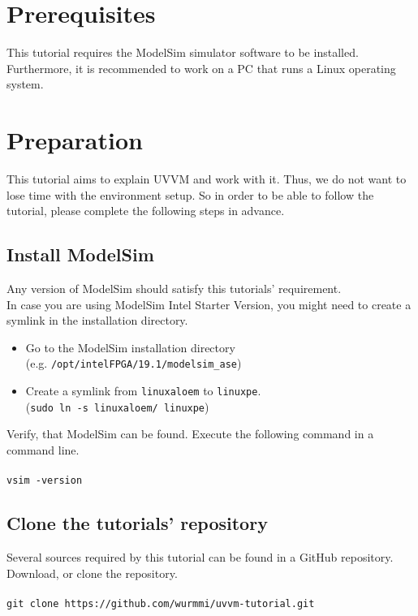 \section{Prerequisites}

This tutorial requires the ModelSim simulator software to be installed.
Furthermore, it is recommended to work on a PC that runs a Linux operating system.

\section{Preparation}

This tutorial aims to explain UVVM and work with it.
Thus, we do not want to lose time with the environment setup.
So in order to be able to follow the tutorial, please complete the
following steps in advance.

\subsection{Install ModelSim}

Any version of ModelSim should satisfy this tutorials' requirement.\\

In case you are using ModelSim Intel Starter Version, you might need to
create a symlink in the installation directory.
\begin{itemize}
  \item Go to the ModelSim installation directory\\
        (e.g. \texttt{/opt/intelFPGA/19.1/modelsim\_ase})
  \item Create a symlink from \texttt{linuxaloem} to \texttt{linuxpe}.\\
        (\texttt{sudo ln -s linuxaloem/ linuxpe})
\end{itemize}

Verify, that ModelSim can be found. Execute the following command in a command line.\\
\\
\texttt{vsim -version}

\subsection{Clone the tutorials' repository}

Several sources required by this tutorial can be found in a GitHub repository.\\
Download, or clone the repository.\\
\\
\texttt{git clone https://github.com/wurmmi/uvvm-tutorial.git}

